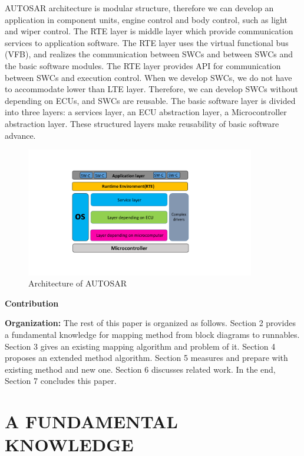 \documentclass[conference,compsoc]{IEEEtran}
\begin{document}
AUTOSAR architecture is modular structure, therefore we can develop an application in component units, engine control and body control, such as light and wiper control.
 The RTE layer is middle layer which provide communication services to application software.
The RTE layer uses the virtual functional bus (VFB), and realizes the communication between SWCs and between  SWCs and the basic software modules.
The RTE layer provides API for communication between SWCs and execution control.
When we develop SWCs, we do not have to accommodate lower than LTE layer.
Therefore, we can develop SWCs without depending on ECUs, and SWCs are reusable.
 The basic software layer is divided into three layers: a services layer, an ECU abstraction layer, a Microcontroller abstraction layer.
These structured layers make reusability of basic software advance. 

\begin{figure}
	\centering
	\includegraphics[width=10cm,clip]{figure3.pdf}
	\caption{Architecture of AUTOSAR}
	\label{fig1}
\end{figure}

 {\bf Contribution}

 {\bf Organization:} The rest of this paper is organized as follows.
Section 2 provides a fundamental knowledge for mapping method from block diagrams to runnables.
Section 3 gives an existing mapping algorithm and problem of it.
Section 4 proposes an extended method algorithm.
Section 5 measures and prepare with existing method and new one.
Section 6 discusses related work.
In the end, Section 7 concludes this paper.   
\section {A FUNDAMENTAL KNOWLEDGE}
\end{document}
